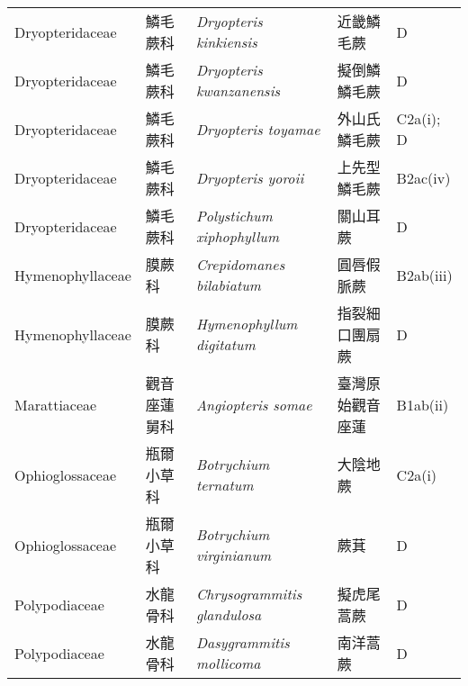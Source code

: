 {\begin{longtable}{p{2.5cm}p{2.5cm}p{4.5cm}p{2.5cm}p{3cm}}
    Dryopteridaceae & 鱗毛蕨科 & \textit{Dryopteris kinkiensis}  & 近畿鱗毛蕨 & D \index{Dryopteris@\textit{Dryopteris}!kinkiensis@\textit{kinkiensis}}  \index{近畿鱗毛蕨} \\
    Dryopteridaceae & 鱗毛蕨科 & \textit{Dryopteris kwanzanensis}  & 擬倒鱗鱗毛蕨 & D \index{Dryopteris@\textit{Dryopteris}!kwanzanensis@\textit{kwanzanensis}}  \index{擬倒鱗鱗毛蕨} \\
    Dryopteridaceae & 鱗毛蕨科 & \textit{Dryopteris toyamae}  & 外山氏鱗毛蕨 & C2a(i); D \index{Dryopteris@\textit{Dryopteris}!toyamae@\textit{toyamae}}  \index{外山氏鱗毛蕨} \\
    Dryopteridaceae & 鱗毛蕨科 & \textit{Dryopteris yoroii}  & 上先型鱗毛蕨 & B2ac(iv) \index{Dryopteris@\textit{Dryopteris}!yoroii@\textit{yoroii}}  \index{上先型鱗毛蕨} \\
    Dryopteridaceae & 鱗毛蕨科 & \textit{Polystichum xiphophyllum}  & 關山耳蕨 & D \index{Polystichum@\textit{Polystichum}!xiphophyllum@\textit{xiphophyllum}}  \index{關山耳蕨} \\
    Hymenophyllaceae & 膜蕨科 & \textit{Crepidomanes bilabiatum}  & 圓唇假脈蕨 & B2ab(iii) \index{Crepidomanes@\textit{Crepidomanes}!bilabiatum@\textit{bilabiatum}}  \index{圓唇假脈蕨} \\
    Hymenophyllaceae & 膜蕨科 & \textit{Hymenophyllum digitatum}  & 指裂細口團扇蕨 & D \index{Hymenophyllum@\textit{Hymenophyllum}!digitatum@\textit{digitatum}}  \index{指裂細口團扇蕨} \\
    Marattiaceae & 觀音座蓮舅科 & \textit{Angiopteris somae}  & 臺灣原始觀音座蓮 & B1ab(ii) \index{Angiopteris@\textit{Angiopteris}!somae@\textit{somae}}  \index{臺灣原始觀音座蓮} \\
    Ophioglossaceae & 瓶爾小草科 & \textit{Botrychium ternatum}  & 大陰地蕨 & C2a(i) \index{Botrychium@\textit{Botrychium}!ternatum@\textit{ternatum}}  \index{大陰地蕨} \\
    Ophioglossaceae & 瓶爾小草科 & \textit{Botrychium virginianum}  & 蕨萁 & D \index{Botrychium@\textit{Botrychium}!virginianum@\textit{virginianum}}  \index{蕨萁} \\
    Polypodiaceae & 水龍骨科 & \textit{Chrysogrammitis glandulosa}  & 擬虎尾蒿蕨 & D \index{Chrysogrammitis@\textit{Chrysogrammitis}!glandulosa@\textit{glandulosa}}  \index{擬虎尾蒿蕨} \\
    Polypodiaceae & 水龍骨科 & \textit{Dasygrammitis mollicoma}  & 南洋蒿蕨 & D \index{Dasygrammitis@\textit{Dasygrammitis}!mollicoma@\textit{mollicoma}}  \index{南洋蒿蕨} \\

\end{longtable}}

